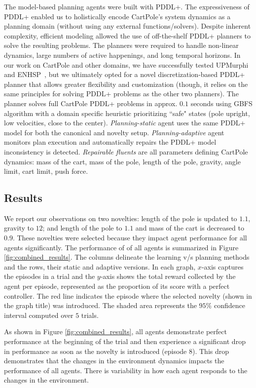 \documentclass[letterpaper]{article} %
\begin{document}
The model-based planning agents were built with PDDL+. The expressiveness of PDDL+ enabled us to holistically encode CartPole's system dynamics as a planning domain (without using any external functions/solvers). Despite inherent complexity, efficient modeling allowed the use of off-the-shelf PDDL+ planners to solve the resulting problems. The planners were required to handle non-linear dynamics, large numbers of active happenings, and long temporal horizons. In our work on CartPole and other domains, we have successfully tested UPMurphi~\cite{della2009upmurphi} and ENHSP~\cite{scala2016interval}, but we ultimately opted for a novel discretization-based PDDL+ planner that allows greater flexibility and customization (though, it relies on the same principles for solving PDDL+ problems as the other two planners). The planner solves full CartPole PDDL+ problems in approx. $0.1$ seconds using GBFS algorithm with a domain specific heuristic prioritizing ``safe" states (pole upright, low velocities, close to the center). \emph{Planning-static} agent uses the same PDDL+ model for both the canonical and novelty setup. \emph{Planning-adaptive} agent monitors plan execution and automatically repairs the PDDL+ model inconsistency is detected. \emph{Repairable fluents} are all parameters defining CartPole dynamics: mass of the cart, mass of the pole, length of the pole, gravity, angle limit, cart limit, push force. 


\subsection{Results}
We report our observations on two novelties: length of the pole is updated to $1.1$, gravity to $12$; and length of the pole to $1.1$ and mass of the cart is decreased to $0.9$. These novelties were selected because they impact agent performance for all agents significantly. The performance of of all agents is summarized in Figure \ref{fig:combined_results}. The columns delineate the learning v/s planning methods and the rows, their static and adaptive versions. In each graph, $x$-axis captures the episodes in a trial and the $y$-axis shows the total reward collected by the agent per episode, represented as the proportion of its score with a perfect controller. The red line indicates the episode where the selected novelty (shown in the graph title) was introduced. The shaded area represents the $95\%$ confidence interval computed over $5$ trials. 

As shown in Figure \ref{fig:combined_results}, all agents demonstrate perfect performance at the beginning of the trial and then experience a significant drop in performance as soon as the novelty is introduced (episode $8$). This drop demonstrates that the changes in the environment dynamics impacts the performance of all agents. There is variability in how each agent responds to the changes in the environment. 
\end{document}
